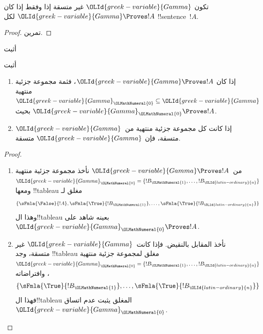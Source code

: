 \documentclass[../../../include/open-logic-section]{subfiles}
\begin{document}
\begin{prop}
تكون ${\OLId{greek-variable}{Gamma}}$ غير متسقة إذا وفقط إذا كان ${\OLId{greek-variable}{Gamma}} \Proves !A$ لكل
!!{sentence}~$!A$.
\end{prop}

\begin{proof}
تمرين.
\end{proof}

\begin{prob}
أثبت 
\end{prob}
\tagendprob

\begin{prob}
أثبت 
\end{prob}
\tagendprob

\begin{prop}[التراص]
  \begin{enumerate}
  \item إذا كان ${\OLId{greek-variable}{Gamma}} \Proves !A$، فثمة مجموعة جزئية منتهية ${\OLId{greek-variable}{Gamma}}_{\OLMathNumeral{0}}
    \subseteq {\OLId{greek-variable}{Gamma}}$ بحيث ${\OLId{greek-variable}{Gamma}}_{\OLMathNumeral{0}} \Proves !A$.
  \item إذا كانت كل مجموعة جزئية منتهية من~${\OLId{greek-variable}{Gamma}}$ متسقة، فإن ${\OLId{greek-variable}{Gamma}}$
    متسقة.
  \end{enumerate}
\end{prop}

\begin{proof}
  \begin{enumerate}
    \item من~${\OLId{greek-variable}{Gamma}} \Proves !A$ نأخذ مجموعة جزئية منتهية
      ${\OLId{greek-variable}{Gamma}}_{\OLMathNumeral{0}} = \{!B_{\OLMathNumeral{1}}, \dots, !B_{\OLId{latin-ordinary}{n}}\}$ ومعها !!{tableau} مغلق لـ
      \[
      \{\sFmla{\False}{!A}, \sFmla{\True}{!B_{\OLMathNumeral{1}}}, \dots, \sFmla{\True}{!B_{\OLId{latin-ordinary}{n}}}\}
      \]
      وهذا ال!!{tableau} بعينه شاهد على~${\OLId{greek-variable}{Gamma}}_{\OLMathNumeral{0}} \Proves !A$.
    \item نأخذ المقابل بالنقيض. فإذا كانت~${\OLId{greek-variable}{Gamma}}$ غير متسقة،
      وجد !!{tableau} مغلق لمجموعة جزئية منتهية
      ${\OLId{greek-variable}{Gamma}}_{\OLMathNumeral{0}} = \{!B_{\OLMathNumeral{1}}, \dots, !B_{\OLId{latin-ordinary}{n}}\}$، وافتراضاته
      \[
      \{\sFmla{\True}{!B_{\OLMathNumeral{1}}}, \dots, \sFmla{\True}{!B_{\OLId{latin-ordinary}{n}}}\}
      \]
      فهذا ال!!{tableau} المغلق يثبت عدم اتساق~${\OLId{greek-variable}{Gamma}}_{\OLMathNumeral{0}}$.
  \end{enumerate}
\end{proof}
\end{document}

